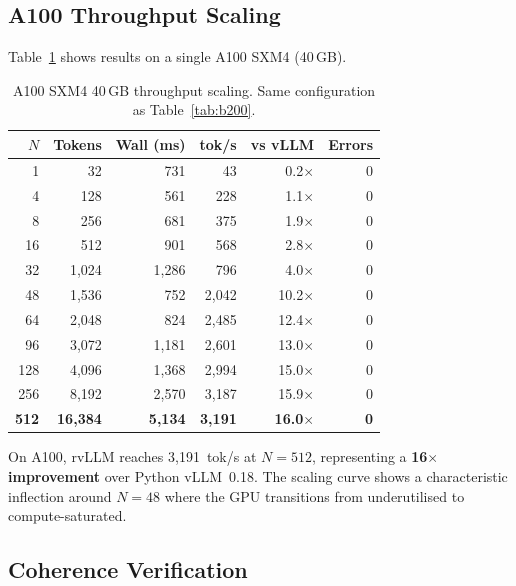 \documentclass[11pt,a4paper]{article}
\newcommand{\thead}[1]{\textbf{#1}}
\begin{document}
\subsection{A100 Throughput Scaling}

Table~\ref{tab:a100} shows results on a single A100 SXM4 (40\,GB).

\begin{table}[t]
  \centering
  \caption{A100 SXM4 40\,GB throughput scaling. Same configuration as Table~\ref{tab:b200}.}
  \label{tab:a100}
  \small
  \begin{tabular}{@{}rrrrrr@{}}
    \toprule
    \rowcolor{HeaderBlue} \thead{$N$} & \thead{Tokens} & \thead{Wall (ms)} & \thead{tok/s} & \thead{vs vLLM} & \thead{Errors} \\
    \midrule
    1    & 32       & 731     & 43     & 0.2$\times$ & 0 \\
    \rowcolor{gray!8}
    4    & 128      & 561     & 228    & 1.1$\times$ & 0 \\
    8    & 256      & 681     & 375    & 1.9$\times$ & 0 \\
    \rowcolor{gray!8}
    16   & 512      & 901     & 568    & 2.8$\times$ & 0 \\
    32   & 1{,}024  & 1{,}286 & 796    & 4.0$\times$ & 0 \\
    \rowcolor{gray!8}
    48   & 1{,}536  & 752     & 2{,}042 & 10.2$\times$ & 0 \\
    64   & 2{,}048  & 824     & 2{,}485 & 12.4$\times$ & 0 \\
    \rowcolor{gray!8}
    96   & 3{,}072  & 1{,}181 & 2{,}601 & 13.0$\times$ & 0 \\
    128  & 4{,}096  & 1{,}368 & 2{,}994 & 15.0$\times$ & 0 \\
    \rowcolor{gray!8}
    256  & 8{,}192  & 2{,}570 & 3{,}187 & 15.9$\times$ & 0 \\
    \textbf{512} & \textbf{16{,}384} & \textbf{5{,}134} & \textbf{3{,}191} & \textbf{16.0$\times$} & \textbf{0} \\
    \bottomrule
  \end{tabular}
\end{table}

On A100, rvLLM reaches 3{,}191~tok/s at $N\!=\!512$, representing a
\textbf{16$\times$ improvement} over Python vLLM~0.18. The scaling curve shows
a characteristic inflection around $N\!=\!48$ where the GPU transitions from
underutilised to compute-saturated.

\subsection{Coherence Verification}
\end{document}
